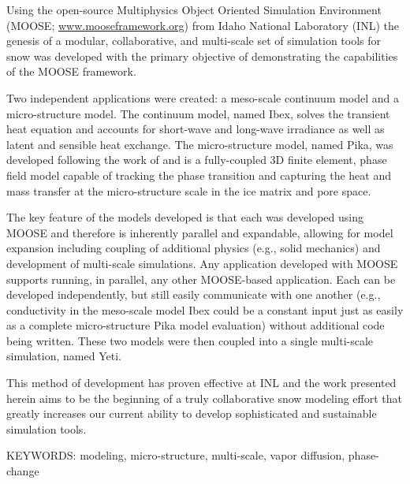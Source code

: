 Using the open-source Multiphysics Object Oriented Simulation Environment (MOOSE; \url{www.mooseframework.org}) from Idaho National Laboratory (INL) the genesis of a modular, collaborative, and multi-scale set of simulation tools for snow was developed with the primary objective of demonstrating the capabilities of the MOOSE framework.

Two independent applications were created: a meso-scale continuum model and a micro-structure model. The continuum model, named Ibex, solves the transient heat equation and accounts for short-wave and long-wave irradiance as well as latent and sensible heat exchange. The micro-structure model, named Pika, was developed following the work of \citet{kaempfer2009phase} and is a fully-coupled 3D finite element, phase field model capable of tracking the phase transition and capturing the heat and mass transfer at the micro-structure scale in the ice matrix and pore space.

The key feature of the models developed is that each was developed using MOOSE and therefore is inherently parallel and expandable, allowing for model expansion including coupling of additional physics (e.g., solid mechanics) and development of multi-scale simulations. Any application developed with MOOSE supports running, in parallel, any other MOOSE-based application. Each can be developed independently, but still easily communicate with one another (e.g., conductivity in the meso-scale model Ibex could be a constant input just as easily as a complete micro-structure Pika model evaluation) without additional code being written.  These two models were then coupled into a single multi-scale simulation, named Yeti.

This method of development has proven effective at INL and the work presented herein aims to be the beginning of a truly collaborative snow modeling effort that greatly increases our current ability to develop sophisticated and sustainable simulation tools.

\bigskip
\noindent KEYWORDS: modeling, micro-structure, multi-scale, vapor diffusion, phase-change
